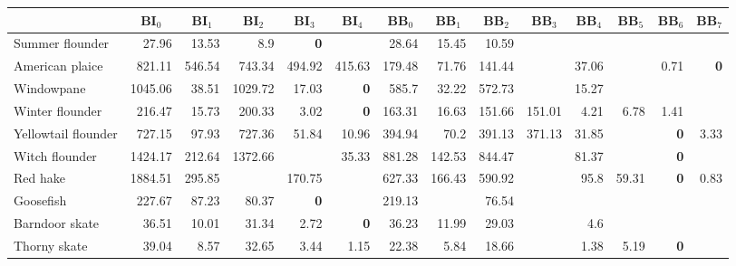 \begin{center}
\begin{tabular}{lrrrrrrrrrrrrr}
\hline\hline
\multicolumn{1}{l}{}&\multicolumn{1}{c}{BI$_{0}$}&\multicolumn{1}{c}{BI$_{1}$}&\multicolumn{1}{c}{BI$_{2}$}&\multicolumn{1}{c}{BI$_{3}$}&\multicolumn{1}{c}{BI$_{4}$}&\multicolumn{1}{c}{BB$_{0}$}&\multicolumn{1}{c}{BB$_{1}$}&\multicolumn{1}{c}{BB$_{2}$}&\multicolumn{1}{c}{BB$_{3}$}&\multicolumn{1}{c}{BB$_{4}$}&\multicolumn{1}{c}{BB$_{5}$}&\multicolumn{1}{c}{BB$_{6}$}&\multicolumn{1}{c}{BB$_{7}$}\tabularnewline
\hline
   Summer flounder&   27.96&   13.53&   8.9&\bfseries   0&   &   28.64&   15.45&   10.59&   &   &   &   &   \tabularnewline
   American plaice&   821.11&   546.54&   743.34&   494.92&   415.63&   179.48&   71.76&   141.44&   &   37.06&   &   0.71&\bfseries   0\tabularnewline
   Windowpane&   1045.06&   38.51&   1029.72&   17.03&\bfseries   0&   585.7&   32.22&   572.73&   &   15.27&   &   &   \tabularnewline
   Winter flounder&   216.47&   15.73&   200.33&   3.02&\bfseries   0&   163.31&   16.63&   151.66&   151.01&   4.21&   6.78&   1.41&   \tabularnewline
   Yellowtail flounder&   727.15&   97.93&   727.36&   51.84&   10.96&   394.94&   70.2&   391.13&   371.13&   31.85&   &\bfseries   0&   3.33\tabularnewline
   Witch flounder&   1424.17&   212.64&   1372.66&   &   35.33&   881.28&   142.53&   844.47&   &   81.37&   &\bfseries   0&   \tabularnewline
   Red hake&   1884.51&   295.85&   &   170.75&   &   627.33&   166.43&   590.92&   &   95.8&   59.31&\bfseries   0&   0.83\tabularnewline
   Goosefish&   227.67&   87.23&   80.37&\bfseries   0&   &   219.13&   &   76.54&   &   &   &   &   \tabularnewline
   Barndoor skate&   36.51&   10.01&   31.34&   2.72&\bfseries   0&   36.23&   11.99&   29.03&   &   4.6&   &   &   \tabularnewline
   Thorny skate&   39.04&   8.57&   32.65&   3.44&   1.15&   22.38&   5.84&   18.66&   &   1.38&   5.19&\bfseries   0&   \tabularnewline
\hline
\end{tabular}\end{center}
